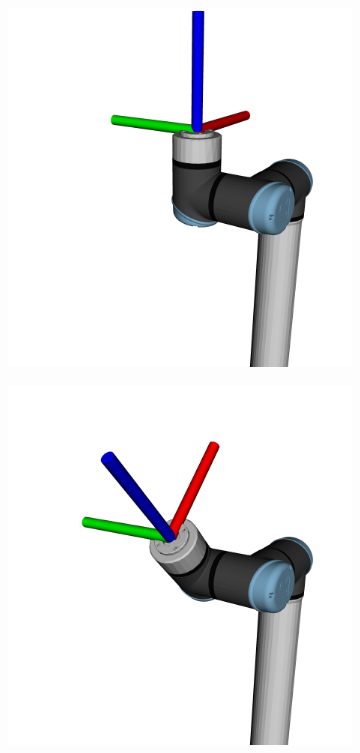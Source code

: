 \begin{figure}[h]
    \centering
    \begin{subfigure}{.195\linewidth}
      \centering
      \includegraphics[width=\linewidth]{figs/chp3/P1.png}
      \label{fig:eef_p1}
    \end{subfigure}%
    \begin{subfigure}{.195\linewidth}
      \centering
      \includegraphics[width=\linewidth]{figs/chp3/P2.png}

\end{subfigure}
\end{figure}
